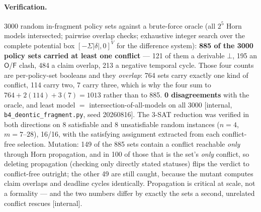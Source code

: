 \documentclass[11pt,a4paper]{article}
\newcommand{\Ob}{\mathsf{O}}
\newcommand{\Fb}{\mathsf{F}}
\begin{document}
\paragraph{Verification.} 3000 random in-fragment policy sets against a brute-force oracle (all $2^5$ Horn models intersected;
pairwise overlap checks; exhaustive integer search over the complete potential box $[-\Sigma|\delta|,0]^V$ for the difference
system): \textbf{885 of the 3000 policy sets carried at least one conflict} --- 121 of them a derivable $\bot$, 195 an
$\Ob$/$\Fb$ clash, 484 a claim overlap, 213 a negative temporal cycle. Those four counts are per-policy-set booleans and they
\emph{overlap}: 764 sets carry exactly one kind of conflict, 114 carry two, 7 carry three, which is why the four sum to
$764+2(114)+3(7)=1013$ rather than to 885. \textbf{0 disagreements} with the oracle, and least model $=$
intersection-of-all-models on all 3000 [internal, \texttt{b4\_deontic\_fragment.py}, seed 20260816]. The 3-SAT reduction was
verified in both directions on 8 satisfiable and 8 unsatisfiable random instances ($n{=}4$, $m{=}7$--$28$), 16/16, with the
satisfying assignment extracted from each conflict-free selection. Mutation: 149 of the 885 sets contain a conflict reachable
\emph{only} through Horn propagation, and in 100 of those that is the set's \emph{only} conflict, so deleting propagation
(checking only directly stated statuses) flips the verdict to conflict-free outright; the other 49 are still caught, because
the mutant computes claim overlaps and deadline cycles identically. Propagation is critical at scale, not a formality ---
and the two numbers differ by exactly the sets a second, unrelated conflict rescues [internal].
\end{document}
